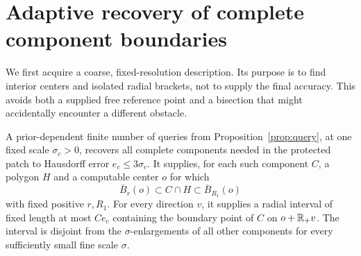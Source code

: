 \section{Adaptive recovery of complete component boundaries}
\label{sec:boundary}
We first acquire a coarse, fixed-resolution description. Its purpose
is to find interior centers and isolated radial brackets, not to supply
the final accuracy. This avoids both a supplied free reference point
and a bisection that might accidentally encounter a different obstacle.

\begin{lemma}\label{lem:coarse}
A prior-dependent finite number of queries from
Proposition~\ref{prop:query}, at one fixed scale $\sigma_c>0$, recovers
all complete components needed in the protected patch to Hausdorff
error $e_c\le3\sigma_c$. It supplies, for each such component $C$, a
polygon $H$ and a computable center $o$ for which
\begin{equation}\label{eq:inner-ball}
 \overline B_r(o)\subset C\cap H\subset\overline B_{R_1}(o)
\end{equation}
with fixed positive $r,R_1$. For every direction $v$, it supplies a
radial interval of fixed length at most $C e_c$ containing the boundary
point of $C$ on $o+\mathbb R_+v$. The interval is disjoint from the
$\sigma$-enlargements of all other components for every sufficiently
small fine scale $\sigma$.
\end{lemma}
